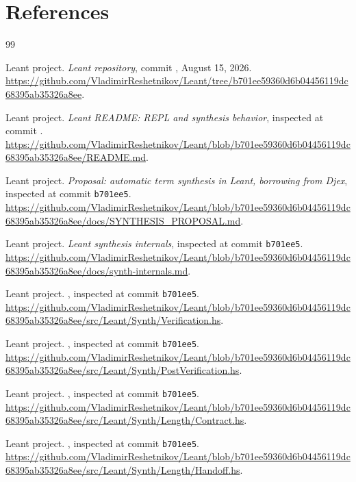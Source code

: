 \documentclass[11pt,oneside]{report}
\newcommand{\code}[1]{\texttt{#1}}
\begin{document}
\chapter*{References}
\begin{thebibliography}{99}

Leant project.
\newblock \emph{Leant repository}, commit
, August 15, 2026.
\newblock \url{https://github.com/VladimirReshetnikov/Leant/tree/b701ee59360d6b04456119dc68395ab35326a8ee}.

Leant project.
\newblock \emph{Leant README: REPL and synthesis behavior}, inspected at commit
.
\newblock \url{https://github.com/VladimirReshetnikov/Leant/blob/b701ee59360d6b04456119dc68395ab35326a8ee/README.md}.

Leant project.
\newblock \emph{Proposal: automatic term synthesis in Leant, borrowing from Djex}, inspected at commit \code{b701ee5}.
\newblock \url{https://github.com/VladimirReshetnikov/Leant/blob/b701ee59360d6b04456119dc68395ab35326a8ee/docs/SYNTHESIS_PROPOSAL.md}.

Leant project.
\newblock \emph{Leant synthesis internals}, inspected at commit \code{b701ee5}.
\newblock \url{https://github.com/VladimirReshetnikov/Leant/blob/b701ee59360d6b04456119dc68395ab35326a8ee/docs/synth-internals.md}.

Leant project.
\newblock {}, inspected at commit \code{b701ee5}.
\newblock \url{https://github.com/VladimirReshetnikov/Leant/blob/b701ee59360d6b04456119dc68395ab35326a8ee/src/Leant/Synth/Verification.hs}.

Leant project.
\newblock {}, inspected at commit \code{b701ee5}.
\newblock \url{https://github.com/VladimirReshetnikov/Leant/blob/b701ee59360d6b04456119dc68395ab35326a8ee/src/Leant/Synth/PostVerification.hs}.

Leant project.
\newblock {}, inspected at commit \code{b701ee5}.
\newblock \url{https://github.com/VladimirReshetnikov/Leant/blob/b701ee59360d6b04456119dc68395ab35326a8ee/src/Leant/Synth/Length/Contract.hs}.

Leant project.
\newblock {}, inspected at commit \code{b701ee5}.
\newblock \url{https://github.com/VladimirReshetnikov/Leant/blob/b701ee59360d6b04456119dc68395ab35326a8ee/src/Leant/Synth/Length/Handoff.hs}.


\end{thebibliography}
\end{document}
